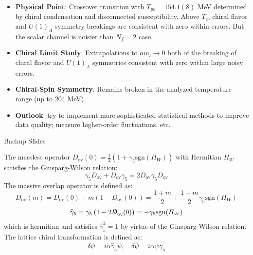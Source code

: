 \documentclass[10pt, aspectratio=169]{beamer} %
\begin{document}
\begin{frame}
\vfill
\begin{itemize}
    \setlength{\itemsep}{0.65em}
    \item \textbf{Physical Point}: Crossover transition with $T_{pc} = 154.1(8)$ MeV determined by chiral condensation and disconnected susceptibility. Above $T_c$, chiral flavor and $U(1)_A$ symmetry breakings are consistent with zero within errors. But the scalar channel is noisier than $N_f = 2$ case.
    \item \textbf{Chiral Limit Study}: Extrapolations to $am_l \to 0$ both of the breaking of chiral flavor and $U(1)_A$ symmetries consistent with zero within large noisy errors.
    \item \textbf{Chiral-Spin Symmetry}: Remains broken in the analyzed temperature range (up to 204 MeV).
    \item \textbf{Outlook}:  try to implement more sophisticated statistical methods to improve data quality; measure higher-order fluctuations, etc.
\end{itemize}
\vfill
\end{frame}

\begin{frame}[noframenumbering]
\centering
\Huge Backup Slides
\end{frame}

\begin{frame}[noframenumbering]
\vfill
The massless operator $D_{\mathrm{ov}}(0) = \frac{1}{2} (1 + \gamma_5 \mathrm{sgn}(H_W))$ with Hermitian $H_W$ satisfies the Ginsparg-Wilson relation:
\[ \gamma_5 D_{\mathrm{ov}} + D_{\mathrm{ov}} \gamma_5 = 2 D_{\mathrm{ov}} \gamma_5 D_{\mathrm{ov}} \]
The massive overlap operator is defined as:
\[ D_{\mathrm{ov}}(m) = D_{\mathrm{ov}}(0) + m (1 - D_{\mathrm{ov}}(0)) = \frac{1+m}{2} + \frac{1-m}{2} \gamma_5 \mathrm{sgn}(H_W) \]
\begin{equation}
\widehat{\gamma}_5 = \gamma_5 \left( 1 - 2 \slashed{D}_{\mathrm{ov}}(0) \right) = -\gamma_5 \mathrm{sgn}(H_W)
\label{eq:hat_gamma_5}
\end{equation}
which is hermitian and satisfies $\widehat{\gamma}_5^2 = 1$ by virtue of the Ginsparg-Wilson relation. The lattice chiral transformation is defined as:
\begin{equation}
\delta \psi = i \alpha \widehat{\gamma}_5 \psi, \quad \delta \overline{\psi} = i \alpha \overline{\psi} \gamma_5
\label{eq:overlap_chiral_trans}
\end{equation}
\vfill
\end{frame}
\end{document}

